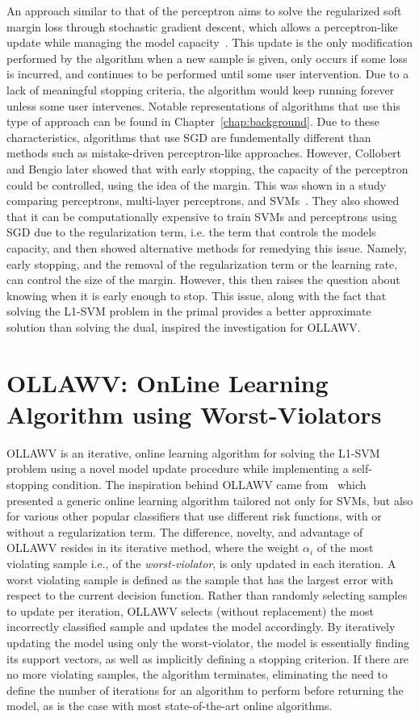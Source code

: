 \documentclass[reqno]{vcuthesis}
\numberwithin{equation}{chapter}
\begin{document}
An approach similar to that of the perceptron aims to solve the regularized soft margin loss through stochastic gradient descent, which allows a perceptron-like update while managing the model capacity~\cite{panagiotakopoulos2013stochastic}. This update is the only modification performed by the algorithm when a new sample is given, only occurs if some loss is incurred, and continues to be performed until some user intervention. Due to a lack of meaningful stopping criteria, the algorithm would keep running forever unless some user intervenes. Notable representations of algorithms that use this type of approach can be found in Chapter~\ref{chap:background}. Due to these characteristics, algorithms that use SGD are fundementally different than methods such as mistake-driven perceptron-like approaches. However, Collobert and Bengio later showed that with early stopping, the capacity of the perceptron could be controlled, using the idea of the margin. This was shown in a study comparing perceptrons, multi-layer perceptrons, and SVMs~\cite{collobert2004links}. They also showed that it can be computationally expensive to train SVMs and perceptrons using SGD due to the regularization term, i.e. the term that controls the models capacity, and then showed alternative methods for remedying this issue. Namely, early stopping, and the removal of the regularization term or the learning rate, can control the size of the margin. However, this then raises the question about knowing when it is early enough to stop. This issue, along with the fact that solving the L1-SVM problem in the primal provides a better approximate solution than solving the dual, inspired the investigation for OLLAWV.

\section{OLLAWV: OnLine Learning Algorithm using Worst-Violators}
OLLAWV is an iterative, online learning algorithm for solving the L1-SVM problem using a novel model update procedure while implementing a self-stopping condition. The inspiration behind OLLAWV came from~\cite{kecman2016fast} which presented a generic online learning algorithm tailored not only for SVMs, but also for various other popular classifiers that use different risk functions, with or without a regularization term. The difference, novelty, and advantage of OLLAWV resides in its iterative method, where the weight $\alpha_i$ of the most violating sample i.e., of the \textit{worst-violator}, is only updated in each iteration. A worst violating sample is defined as the sample that has the largest error with respect to the current decision function. Rather than randomly selecting samples to update per iteration, OLLAWV selects (without replacement) the most incorrectly classified sample and updates the model accordingly. By iteratively updating the model using only the worst-violator, the model is essentially finding its support vectors, as well as implicitly defining a stopping criterion. If there are no more violating samples, the algorithm terminates, eliminating the need to define the number of iterations for an algorithm to perform before returning the model, as is the case with most state-of-the-art online algorithms. 
\end{document}
